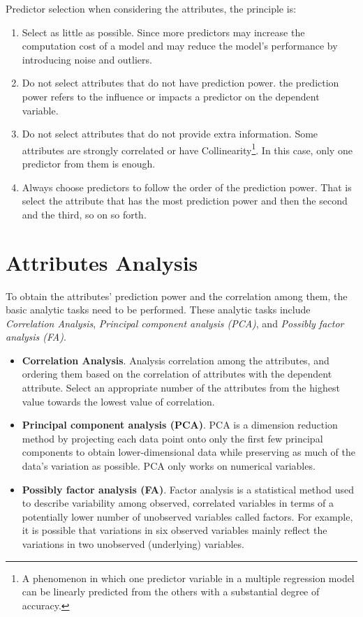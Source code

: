 \documentclass[
]{book}
\providecommand{\tightlist}{%
  \setlength{\itemsep}{0pt}\setlength{\parskip}{0pt}}
\begin{document}
Predictor selection when considering the attributes, the principle is:

\begin{enumerate}
\def\labelenumi{\arabic{enumi}.}
\tightlist
\item
  Select as little as possible. Since more predictors may increase the computation cost of a model and may reduce the model's performance by introducing noise and outliers.
\item
  Do not select attributes that do not have prediction power. the prediction power refers to the influence or impacts a predictor on the dependent variable.
\item
  Do not select attributes that do not provide extra information. Some attributes are strongly correlated or have Collinearity\footnote{A phenomenon in which one predictor variable in a multiple regression model can be linearly predicted from the others with a substantial degree of accuracy.}. In this case, only one predictor from them is enough.
\item
  Always choose predictors to follow the order of the prediction power. That is select the attribute that has the most prediction power and then the second and the third, so on so forth.
\end{enumerate}

\hypertarget{attributes-analysis}{%
\section{Attributes Analysis}\label{attributes-analysis}}

To obtain the attributes' prediction power and the correlation among them, the basic analytic tasks need to be performed. These analytic tasks include \emph{Correlation Analysis}, \emph{Principal component analysis (PCA)}, and \emph{Possibly factor analysis (FA)}.

\begin{itemize}
\item
  \textbf{Correlation Analysis}. Analysis correlation among the attributes, and ordering them based on the correlation of attributes with the dependent attribute. Select an appropriate number of the attributes from the highest value towards the lowest value of correlation.
\item
  \textbf{Principal component analysis (PCA)}. PCA is a dimension reduction method by projecting each data point onto only the first few principal components to obtain lower-dimensional data while preserving as much of the data's variation as possible. PCA only works on numerical variables.
\item
  \textbf{Possibly factor analysis (FA)}. Factor analysis is a statistical method used to describe variability among observed, correlated variables in terms of a potentially lower number of unobserved variables called factors. For example, it is possible that variations in six observed variables mainly reflect the variations in two unobserved (underlying) variables.
\end{itemize}
\end{document}
